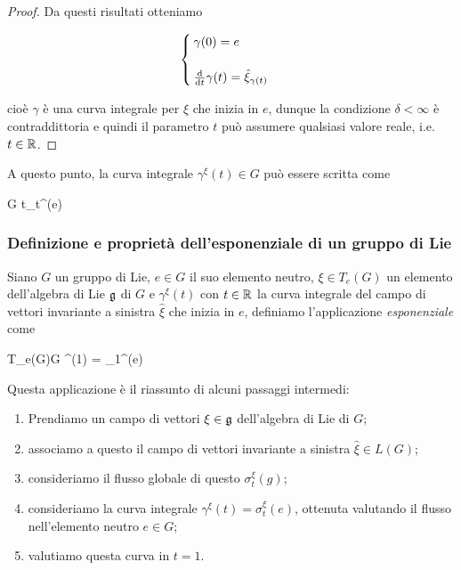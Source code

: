 \begin{proof}
	Da questi risultati otteniamo
		
	\begin{equation}
		\begin{cases}
			\gamma(0) = e\\\\
			\dv{t} \gamma(t) = \hat{\xi}_{\gamma(t)}
		\end{cases}
	\end{equation}	
	
	cioè $ \gamma $ è una curva integrale per $ \hat{\xi} $ che inizia in $ e $, dunque la condizione $ \delta < \infty $ è contraddittoria e quindi il parametro $ t $ può assumere qualsiasi valore reale, i.e. $ t \in \mathbb{R} $.
\end{proof}

A questo punto, la curva integrale $ \gamma^{\xi}(t) \in G $ può essere scritta come

\map{\gamma^{\xi}}%
	{\R}{G}%
	{t}{\sigma_{t}^{\xi}(e)}

\subsubsection{Definizione e proprietà dell'esponenziale di un gruppo di Lie}

Siano $ G $ un gruppo di Lie, $ e \in G $ il suo elemento neutro, $ \xi \in T_{e}(G) $ un elemento dell'algebra di Lie $ \mathfrak{g} $ di $ G $ e $ \gamma^{\xi}(t) $ con $ t \in \mathbb{R} $ la curva integrale del campo di vettori invariante a sinistra $ \hat{\xi} $ che inizia in $ e $, definiamo l'applicazione \textit{esponenziale} come

\map{\exp}%
	{T_{e}(G)}{G}%
	{\xi}{\gamma^{\xi}(1) = \sigma_{1}^{\xi}(e)}

Questa applicazione è il riassunto di alcuni passaggi intermedi:

\begin{enumerate}
	\item Prendiamo un campo di vettori $ \xi \in \mathfrak{g} $ dell'algebra di Lie di $ G $;
	
	\item associamo a questo il campo di vettori invariante a sinistra $ \hat{\xi} \in L(G) $;
	
	\item consideriamo il flusso globale di questo $ \sigma_{t}^{\xi}(g) $;
	
	\item consideriamo la curva integrale $ \gamma^{\xi}(t) = \sigma_{t}^{\xi}(e) $, ottenuta valutando il flusso nell'elemento neutro $ e \in G $;
	
	\item valutiamo questa curva in $ t=1 $.
\end{enumerate}

